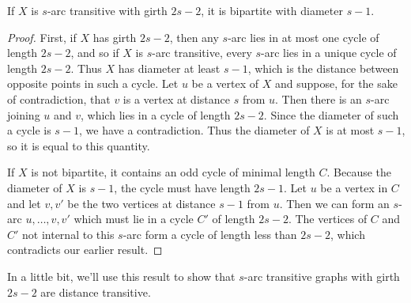 \begin{lemma}[Tutte]
	If $X$ is $s$-arc transitive with girth $2s-2$, it is bipartite with diameter $s-1$.
\end{lemma}
\begin{proof}
	First, if $X$ has girth $2s-2$, then any $s$-arc lies in at most one cycle of length $2s-2$, and so if $X$ is $s$-arc transitive, every $s$-arc lies in a unique cycle of length $2s-2$.  Thus $X$ has diameter at least $s-1$, which is the distance between opposite points in such a cycle.  Let $u$ be a vertex of $X$ and suppose, for the sake of contradiction, that $v$ is a vertex at distance $s$ from $u$.  Then there is an $s$-arc joining $u$ and $v$, which lies in a cycle of length $2s-2$.  Since the diameter of such a cycle is $s-1$, we have a contradiction.  Thus the diameter of $X$ is at most $s-1$, so it is equal to this quantity.
	
	If $X$ is not bipartite, it contains an odd cycle of minimal length $C$.  Because the diameter of $X$ is $s-1$, the cycle must have length $2s-1$.  Let $u$ be a vertex in $C$ and let $v,v'$ be the two vertices at distance $s-1$ from $u$.  Then we can form an $s$-arc $u,\dots,v,v'$ which must lie in a cycle $C'$ of length $2s-2$.  The vertices of $C$ and $C'$ not internal to this $s$-arc form a cycle of length less than $2s-2$, which contradicts our earlier result.
\end{proof}

In a little bit, we'll use this result to show that $s$-arc transitive graphs with girth $2s-2$ are distance transitive.

\ifdraft


\fi